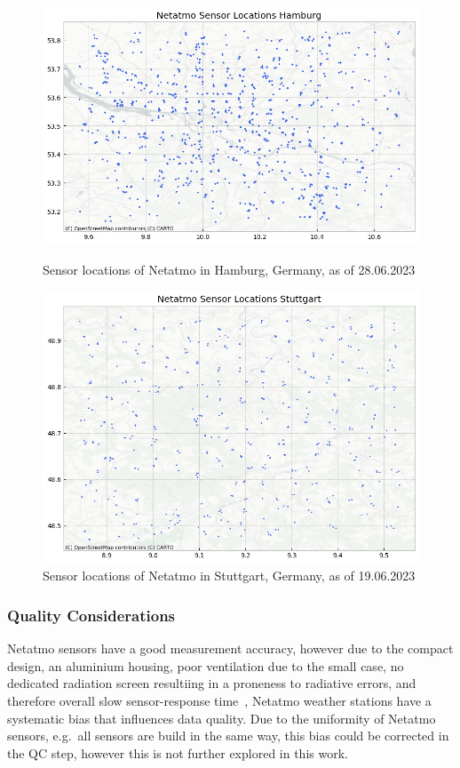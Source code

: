 \begin{figure}[htp]
    \centering
    \includegraphics[width=1\textwidth]{images/netatmo_sensor_locations_hamburg.png}
    \caption{Sensor locations of Netatmo in Hamburg, Germany, as of 28.06.2023}
    \label{fig:netatmo sensor locations hamburg}

    \includegraphics[width=1\textwidth]{images/netatmo_sensor_locations_stuttgart.png}
    \caption{Sensor locations of Netatmo in Stuttgart, Germany, as of 19.06.2023}
    \label{fig:netatmo sensor locations stuttgart}
\end{figure}

\subsubsection{Quality Considerations}

Netatmo sensors have a good measurement accuracy, however due to the compact design, an aluminium housing, poor ventilation due to the small case, no dedicated radiation screen resultiing in a proneness to radiative errors, and therefore overall slow sensor-response time~\cite{meier2017crowdsourcing, buchau2018modelling}, Netatmo weather stations have a systematic bias that influences data quality. Due to the uniformity of Netatmo sensors, e.g.\ all sensors are build in the same way, this bias could be corrected in the QC step, however this is not further explored in this work.

